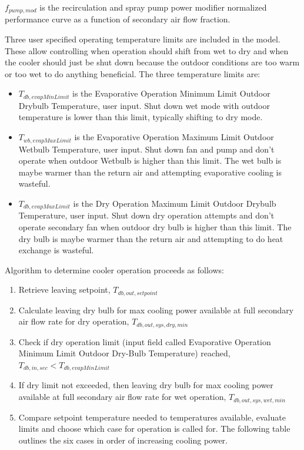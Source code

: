 \(f_{pump,mod}\) is the recirculation and spray pump power modifier normalized performance curve as a function of secondary air flow fraction.

Three user specified operating temperature limits are included in the model. These allow controlling when operation should shift from wet to dry and when the cooler should just be shut down because the outdoor conditions are too warm or too wet to do anything beneficial.  The three temperature limits are:

\begin{itemize}
\item \(T_{db,evapMinLimit}\) is the Evaporative Operation Minimum Limit Outdoor Drybulb Temperature, user input. Shut down wet mode with outdoor temperature is lower than this limit, typically shifting to dry mode.
\item \(T_{wb,evapMaxLimit}\) is the Evaporative Operation Maximum Limit Outdoor Wetbulb Temperature, user input. Shut down fan and pump and don't operate when outdoor Wetbulb is higher than this limit. The wet bulb is maybe warmer than the return air and attempting evaporative cooling is wasteful.
\item \(T_{db,evapMaxLimit}\) is the Dry Operation Maximum Limit Outdoor Drybulb Temperature, user input. Shut down dry operation attempts and don't operate secondary fan when outdoor dry bulb is higher than this limit. The dry bulb is maybe warmer than the return air and attempting to do heat exchange is wasteful.
\end{itemize}

Algorithm to determine cooler operation proceeds as follows:

\begin{enumerate}
\def\labelenumi{\arabic{enumi}.}
\item
  Retrieve leaving setpoint, \(T_{db,out,setpoint}\)
\item
  Calculate leaving dry bulb for max cooling power available at full secondary air flow rate for dry operation, \(T_{db,out,sys,dry,min}\)
\item
  Check if dry operation limit (input field called Evaporative Operation Minimum Limit Outdoor Dry-Bulb Temperature) reached, \(T_{db,in,sec}<T_{db,evapMinLimit}\)
\item
  If dry limit not exceeded, then leaving dry bulb for max cooling power available at full secondary air flow rate for wet operation, \(T_{db,out,sys,wet,min}\)
\item
  Compare setpoint temperature needed to temperatures available, evaluate limits and choose which case for operation is called for. The following table outlines the six cases in order of increasing cooling power.
\end{enumerate}

